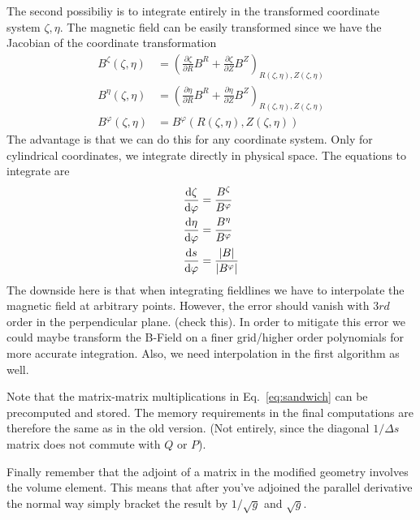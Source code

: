 The second possibiliy is to integrate entirely in the 
transformed coordinate system $\zeta, \eta$. 
The magnetic field can be easily transformed since we have the
Jacobian of the coordinate transformation
\begin{align}
    B^\zeta(\zeta, \eta) &= \left(\frac{\partial \zeta}{\partial R} B^{R} + \frac{\partial \zeta}{\partial Z}B^Z\right)_{R(\zeta, \eta), Z(\zeta, \eta)} \\
    B^\eta(\zeta, \eta) &= \left(\frac{\partial \eta}{\partial R} B^{R} + \frac{\partial \eta}{\partial Z}B^Z\right)_{R(\zeta, \eta), Z(\zeta, \eta)} \\
    B^\varphi(\zeta, \eta) &= B^\varphi({R(\zeta, \eta), Z(\zeta, \eta)})
    \label{eq:field_trafo}
\end{align}
The advantage is that we can do this for any coordinate
system. Only for cylindrical coordinates, we integrate directly in physical space. The equations to integrate
are
\begin{subequations}
\begin{align}
\frac{\mathrm{d} \zeta}{\mathrm{d}\varphi} &= \frac{B^\zeta}{B^\varphi}\\
\frac{\mathrm{d} \eta}{\mathrm{d}\varphi} &= \frac{B^\eta}{B^\varphi}\\
\frac{\mathrm{d} s}{\mathrm{d}\varphi} &= \frac{|B|}{|B^\varphi|}
\end{align}
\label{eq:fieldlines}
\end{subequations}
The downside here is that when integrating fieldlines we
have to interpolate the magnetic field at arbitrary points. 
However, the error should vanish with $3rd$ order in the 
perpendicular plane. (check this). In order to mitigate this error
we could maybe transform the B-Field on a finer grid/higher order polynomials for more accurate
integration. Also, we need interpolation in the 
first algorithm as well. 

Note that the matrix-matrix multiplications in Eq.~\eqref{eq:sandwich} can
be precomputed and stored. The memory requirements 
in the final computations are 
therefore the same  as in the old version. (Not entirely, since
the diagonal $1/\Delta s$ matrix does not commute with $Q$ or $P$).

Finally remember that the adjoint of a matrix in the modified geometry 
involves the volume element. This means that after you've adjoined the 
parallel derivative the normal way simply bracket the result 
by $1/\sqrt{g}$ and $\sqrt{g}$. 
